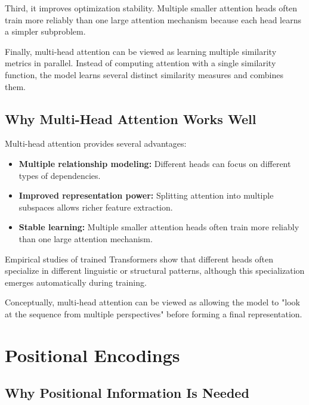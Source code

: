 \documentclass[11pt]{article}
\begin{document}
Third, it improves optimization stability. Multiple smaller attention heads often train more reliably than one large attention mechanism because each head learns a simpler subproblem.

Finally, multi-head attention can be viewed as learning multiple similarity metrics in parallel. Instead of computing attention with a single similarity function, the model learns several distinct similarity measures and combines them.

\subsection{Why Multi-Head Attention Works Well}

Multi-head attention provides several advantages:

\begin{itemize}

\item \textbf{Multiple relationship modeling:}
Different heads can focus on different types of dependencies.

\item \textbf{Improved representation power:}
Splitting attention into multiple subspaces allows richer feature extraction.

\item \textbf{Stable learning:}
Multiple smaller attention heads often train more reliably than one large attention mechanism.

\end{itemize}

Empirical studies of trained Transformers show that different heads often specialize in different linguistic or structural patterns, although this specialization emerges automatically during training.

Conceptually, multi-head attention can be viewed as allowing the model to "look at the sequence from multiple perspectives" before forming a final representation.

\section{Positional Encodings}

\subsection{Why Positional Information Is Needed}
\end{document}
